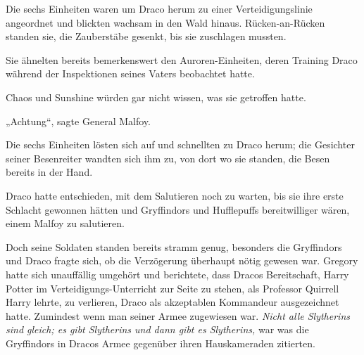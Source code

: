 Die sechs Einheiten waren um Draco herum zu einer Verteidigungslinie angeordnet und blickten wachsam in den Wald hinaus. Rücken-an-Rücken standen sie, die Zauberstäbe gesenkt, bis sie zuschlagen mussten.

Sie ähnelten bereits bemerkenswert den Auroren-Einheiten, deren Training Draco während der Inspektionen seines Vaters beobachtet hatte.

Chaos und Sunshine würden gar nicht wissen, was sie getroffen hatte.

„Achtung“, sagte General Malfoy.

Die sechs Einheiten lösten sich auf und schnellten zu Draco herum; die Gesichter seiner Besenreiter wandten sich ihm zu, von dort wo sie standen, die Besen bereits in der Hand.

Draco hatte entschieden, mit dem Salutieren noch zu warten, bis sie ihre erste Schlacht gewonnen hätten und Gryffindors und Hufflepuffs bereitwilliger wären, einem Malfoy zu salutieren.

Doch seine Soldaten standen bereits stramm genug, besonders die Gryffindors und Draco fragte sich, ob die Verzögerung überhaupt nötig gewesen war. Gregory hatte sich unauffällig umgehört und berichtete, dass Dracos Bereitschaft, Harry Potter im Verteidigungs-Unterricht zur Seite zu stehen, als Professor Quirrell Harry lehrte, zu verlieren, Draco als akzeptablen Kommandeur ausgezeichnet hatte. Zumindest wenn man seiner Armee zugewiesen war. \emph{Nicht alle Slytherins sind gleich; es gibt Slytherins und dann gibt es Slytherins,} war was die Gryffindors in Dracos Armee gegenüber ihren Hauskameraden zitierten.


